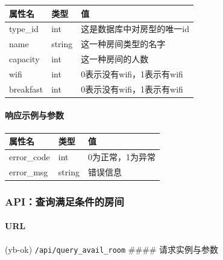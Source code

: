 \documentclass[]{article}
\let\oldparagraph\paragraph
\renewcommand{\paragraph}[1]{\oldparagraph{#1}\mbox{}}
\begin{document}
\begin{Shaded}
\begin{Highlighting}[]
\FunctionTok{\{}
    \FunctionTok{:} \FunctionTok{,}
    \FunctionTok{:} \FunctionTok{,}
\FunctionTok{\}}
\end{Highlighting}
\end{Shaded}

\begin{longtable}[]{@{}lll@{}}
\toprule
属性名 & 类型 & 值\tabularnewline
\midrule
\endhead
type\_id & int & 这是数据库中对房型的唯一id\tabularnewline
name & string & 这一种房间类型的名字\tabularnewline
capacity & int & 这一种房间的人数\tabularnewline
wifi & int & 0表示没有wifi，1表示有wifi\tabularnewline
breakfast & int & 0表示没有wifi，1表示有wifi\tabularnewline
\bottomrule
\end{longtable}

\hypertarget{ux54cdux5e94ux793aux4f8bux4e0eux53c2ux6570-10}{%
\paragraph{响应示例与参数}\label{ux54cdux5e94ux793aux4f8bux4e0eux53c2ux6570-10}}

\begin{longtable}[]{@{}lll@{}}
\toprule
属性名 & 类型 & 值\tabularnewline
\midrule
\endhead
error\_code & int & 0为正常，1为异常\tabularnewline
error\_msg & string & 错误信息\tabularnewline
\bottomrule
\end{longtable}

\hypertarget{apiux67e5ux8be2ux6ee1ux8db3ux6761ux4ef6ux7684ux623fux95f4}{%
\subsubsection{API：查询满足条件的房间}\label{apiux67e5ux8be2ux6ee1ux8db3ux6761ux4ef6ux7684ux623fux95f4}}

\hypertarget{url-19}{%
\paragraph{URL}\label{url-19}}

(yb-ok) \texttt{/api/query\_avail\_room} \#\#\#\# 请求实例与参数

\begin{Shaded}
\begin{Highlighting}[]
\FunctionTok{\{}
    \FunctionTok{:} \FunctionTok{,}
    \FunctionTok{:} \FunctionTok{,}
    \FunctionTok{:} \FunctionTok{,}
    \FunctionTok{:} \FunctionTok{,}
    \FunctionTok{:} 
\FunctionTok{\}}
\end{Highlighting}
\end{Shaded}
\end{document}
